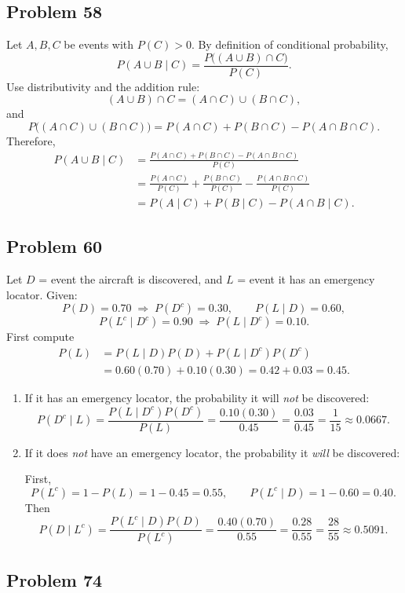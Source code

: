 \documentclass{article}
\begin{document}
\subsection*{Problem 58}

Let $A,B,C$ be events with $P(C)>0$. By definition of conditional probability,
\[
P(A\cup B\mid C)=\frac{P\big((A\cup B)\cap C\big)}{P(C)}.
\]
Use distributivity and the addition rule:
\[
(A\cup B)\cap C=(A\cap C)\cup(B\cap C),
\]
and
\[
P\big((A\cap C)\cup(B\cap C)\big)=P(A\cap C)+P(B\cap C)-P(A\cap B\cap C).
\]
Therefore,
\begin{align*}
P(A\cup B\mid C)
&=\frac{P(A\cap C)+P(B\cap C)-P(A\cap B\cap C)}{P(C)}\\
&=\frac{P(A\cap C)}{P(C)}+\frac{P(B\cap C)}{P(C)}-\frac{P(A\cap B\cap C)}{P(C)}\\
&=P(A\mid C)+P(B\mid C)-P(A\cap B\mid C).
\end{align*}


\subsection*{Problem 60}

Let $D$ = event the aircraft is discovered, and $L$ = event it has an emergency locator.
Given:
\[
P(D)=0.70 \;\Rightarrow\; P(D^c)=0.30,\qquad P(L\mid D)=0.60,
\]
\[
P(L^c\mid D^c)=0.90 \;\Rightarrow\; P(L\mid D^c)=0.10.
\]
First compute
\[
\begin{aligned}
P(L)
&=P(L\mid D)P(D)+P(L\mid D^c)P(D^c)\\
&=0.60(0.70)+0.10(0.30)=0.42+0.03=0.45.
\end{aligned}
\]

\begin{enumerate}
\item[(a)] If it has an emergency locator, the probability it will \emph{not} be discovered:
\[
P(D^c\mid L)=\frac{P(L\mid D^c)P(D^c)}{P(L)}
=\frac{0.10(0.30)}{0.45}=\frac{0.03}{0.45}=\frac{1}{15}\approx 0.0667.
\]

\item[(b)] If it does \emph{not} have an emergency locator, the probability it \emph{will} be discovered:

First,
\[
P(L^c)=1-P(L)=1-0.45=0.55,\qquad P(L^c\mid D)=1-0.60=0.40.
\]
Then
\[
P(D\mid L^c)=\frac{P(L^c\mid D)P(D)}{P(L^c)}
=\frac{0.40(0.70)}{0.55}=\frac{0.28}{0.55}=\frac{28}{55}\approx 0.5091.
\]
\end{enumerate}

\subsection*{Problem 74}
\end{document}
